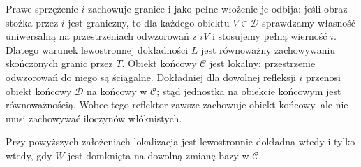 Prawe sprzężenie $i$ zachowuje granice i jako pełne włożenie je odbija: jeśli obraz stożka przez $i$ jest graniczny, to dla każdego obiektu $V\in\mathcal D$ sprawdzamy własność uniwersalną na przestrzeniach odwzorowań z $iV$ i stosujemy pełną wierność $i$. Dlatego warunek lewostronnej dokładności $L$ jest równoważny zachowywaniu skończonych granic przez $T$. Obiekt końcowy $\mathcal C$ jest lokalny: przestrzenie odwzorowań do niego są ściągalne. Dokładniej dla dowolnej refleksji $i$ przenosi obiekt końcowy $\mathcal D$ na końcowy w $\mathcal C$; stąd jednostka na obiekcie końcowym jest równoważnością. Wobec tego reflektor zawsze zachowuje obiekt końcowy, ale nie musi zachowywać iloczynów włóknistych.

\begin{twierdzenie}\label{cat:thm:infty-bousfield-left-exact}
Przy powyższych założeniach lokalizacja jest lewostronnie dokładna wtedy i tylko wtedy, gdy $W$ jest domknięta na dowolną zmianę bazy w $\mathcal C$.
\end{twierdzenie}
